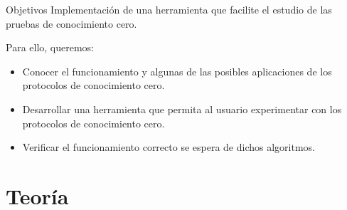 \documentclass[8pt,xcolor=dvipsnames]{beamer}
\begin{document}

\begin{frame}[fragile]{Objetivos}
    Implementación de una herramienta que facilite el estudio de las pruebas de conocimiento cero.
    
    Para ello, queremos:
    \begin{itemize}
        \item Conocer el funcionamiento y algunas de las posibles aplicaciones de los protocolos de conocimiento cero.
        \item Desarrollar una herramienta que permita al usuario experimentar con los protocolos de conocimiento cero.
        \item Verificar el funcionamiento correcto se espera de dichos algoritmos.
    \end{itemize}
\end{frame}


\section{Teoría}
\end{document}
